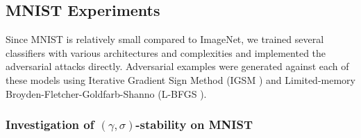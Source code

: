 


\subsection{MNIST Experiments}

Since MNIST is relatively small compared to ImageNet, we trained several classifiers with various architectures and complexities and implemented the adversarial attacks directly. Adversarial examples were generated against each of these models using Iterative Gradient Sign Method (IGSM \citep{kurakin_adversarial_2016}) and Limited-memory Broyden-Fletcher-Goldfarb-Shanno (L-BFGS \citep{liu1989limited}).


 

\subsubsection{Investigation of $(\gamma, \sigma)$-stability on MNIST}\label{sec:mnist}

